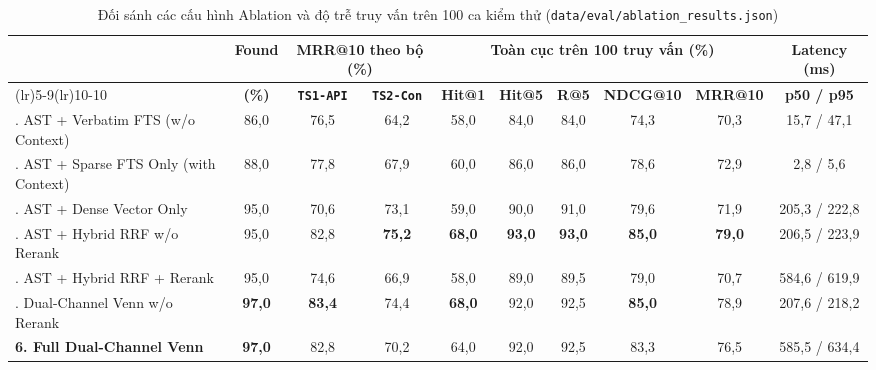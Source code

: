 \begin{table}[H]
\centering
\caption{Đối sánh các cấu hình Ablation và độ trễ truy vấn trên 100 ca kiểm thử (\texttt{data/eval/ablation\_results.json})}
\label{tab:comparison}
\scriptsize\setlength{\tabcolsep}{3pt}\begin{tabularx}{\textwidth}{>{\raggedright\arraybackslash}Xccccccccc}
\toprule
\multirow{2}{*}{\textbf{Phương pháp / Cấu hình}} & \multirow{2}{*}{\textbf{Found}} & \multicolumn{2}{c}{\textbf{MRR@10 theo bộ (\%)}} & \multicolumn{5}{c}{\textbf{Toàn cục trên 100 truy vấn (\%)}} & \textbf{Latency (ms)} \\
\cmidrule(lr){3-4}\cmidrule(lr){5-9}\cmidrule(lr){10-10}
 & \textbf{(\%)} & \textbf{\texttt{TS1-API}} & \textbf{\texttt{TS2-Con}} & \textbf{Hit@1} & \textbf{Hit@5} & \textbf{R@5} & \textbf{NDCG@10} & \textbf{MRR@10} & \textbf{p50 / p95} \\
\midrule
0. AST + Verbatim FTS (w/o Context) & 86,0 & 76,5 & 64,2 & 58,0 & 84,0 & 84,0 & 74,3 & 70,3 & 15,7 / 47,1 \\
1. AST + Sparse FTS Only (with Context) & 88,0 & 77,8 & 67,9 & 60,0 & 86,0 & 86,0 & 78,6 & 72,9 & 2,8 / 5,6 \\
2. AST + Dense Vector Only & 95,0 & 70,6 & 73,1 & 59,0 & 90,0 & 91,0 & 79,6 & 71,9 & 205,3 / 222,8 \\
3. AST + Hybrid RRF w/o Rerank & 95,0 & 82,8 & \textbf{75,2} & \textbf{68,0} & \textbf{93,0} & \textbf{93,0} & \textbf{85,0} & \textbf{79,0} & 206,5 / 223,9 \\
4. AST + Hybrid RRF + Rerank & 95,0 & 74,6 & 66,9 & 58,0 & 89,0 & 89,5 & 79,0 & 70,7 & 584,6 / 619,9 \\
5. Dual-Channel Venn w/o Rerank & \textbf{97,0} & \textbf{83,4} & 74,4 & \textbf{68,0} & 92,0 & 92,5 & \textbf{85,0} & 78,9 & 207,6 / 218,2 \\
\textbf{6. Full Dual-Channel Venn} & \textbf{97,0} & 82,8 & 70,2 & 64,0 & 92,0 & 92,5 & 83,3 & 76,5 & 585,5 / 634,4 \\
\bottomrule
\end{tabularx}
\end{table}

